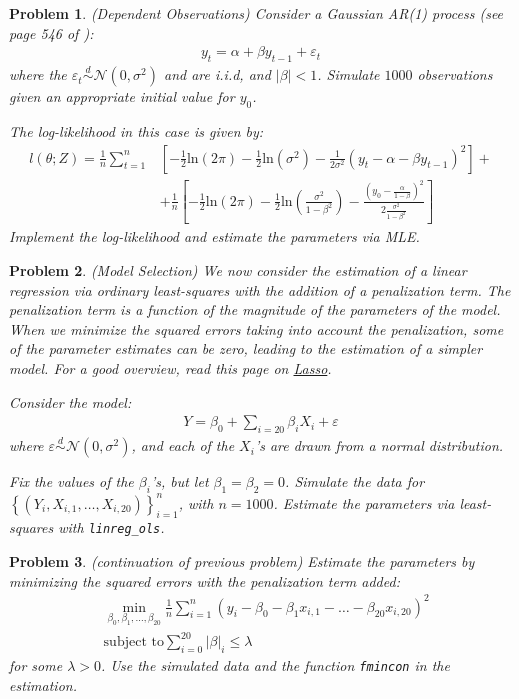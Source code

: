\documentclass[12pt, a4paper]{article}
\newcommand{\abs}[1]{\left\vert{#1}\right\vert}
\newcommand{\Normal}[1]{\mathcal{N}\left(0, #1\right)}
\newcommand{\Set}[1]{\left\{#1\right\}}
\renewcommand{\ln}[1]{\text{ln}\left(#1\right)}
\newtheorem{problem}{Problem}
\begin{document}
\begin{problem}
(Dependent Observations)
Consider a Gaussian AR(1) process (see page 546 of \citet{H2000}):
\begin{align*}
y_t = \alpha + \beta y_{t-1} + \varepsilon_t
\end{align*}
where the \(\varepsilon_t\overset{d}{\sim}\Normal{\sigma^2}\) and are i.i.d, and \(\abs{\beta}<1\).
Simulate \(1000\) observations given an appropriate initial value for \(y_0\).

The log-likelihood in this case is given by:
\begin{align*}
  l(\theta; Z)=\frac{1}{n}\sum_{t=1}^n&\left[-\frac{1}{2}\ln{2\pi}-\frac{1}{2}\ln{\sigma^2}-\frac{1}{2\sigma^2}(y_t-\alpha-\beta y_{t-1})^2\right] +\\
& +\frac{1}{n}\left[-\frac{1}{2}\ln{2\pi}-\frac{1}{2}\ln{\frac{\sigma^2}{1-\beta^2}}-\frac{(y_0-\frac{\alpha}{1-\beta})^2}{2\frac{\sigma^2}{1-\beta^2}}\right]
\end{align*}
Implement the log-likelihood and estimate the parameters via MLE.
\end{problem}

\begin{problem}
(Model Selection)
We now consider the estimation of a linear regression via ordinary least-squares with the addition of a penalization term.
The penalization term is a function of the magnitude of the parameters of the model.
When we minimize the squared errors taking into account the penalization, some of the parameter estimates can be zero, leading to the estimation of a simpler model.
For a good overview, read this page on \href{https://en.wikipedia.org/wiki/Lasso\_(statistics)}{Lasso}.

Consider the model:
\begin{align*}
Y = \beta_0 + \sum_{i=20}\beta_i X_i + \varepsilon
\end{align*}
where \(\varepsilon\overset{d}{\sim}\Normal{\sigma^2}\), and each of the \(X_i\)'s are drawn from a normal distribution.

Fix the values of the \(\beta_i\)'s, but let \(\beta_1=\beta_2=0\).
Simulate the data for \(\Set{(Y_i, X_{i, 1}, \ldots, X_{i, 20})}_{i=1}^n\), with \(n=1000\).
Estimate the parameters via least-squares with \texttt{linreg\_ols}.
\end{problem}

\begin{problem}
(continuation of previous problem)
Estimate the parameters by minimizing the squared errors with the penalization term added:
\begin{align*}
&\min_{\beta_0,\beta_1,\ldots,\beta_{20}}{\frac{1}{n}\sum_{i=1}^n(y_i-\beta_0-\beta_1x_{i, 1} - \ldots - \beta_{20}x_{i, 20})^2}\\
&\text{subject to}\sum_{i=0}^{20}\abs{\beta}_i \leq \lambda
\end{align*}
for some \(\lambda > 0\).
Use the simulated data and the function \texttt{fmincon} in the estimation.
\end{problem}
\end{document}
